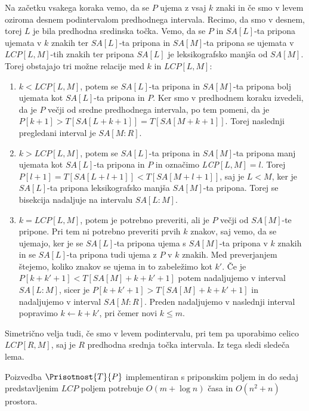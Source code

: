 Na začetku vsakega koraka vemo, da se $P$ ujema z vsaj $k$ znaki in če smo v levem oziroma desnem podintervalom predhodnega intervala. Recimo, da smo v desnem, torej $L$ je bila predhodna sredinska točka. Vemo, da se $P$ in $SA[L]$-ta pripona ujemata v $k$ znakih ter $SA[L]$-ta pripona in $SA[M]$-ta pripona se ujemata v $LCP[L,M]$-tih znakih ter pripona $SA[L]$ je leksikografsko manjša od $SA[M]$. Torej obstajajo tri možne relacije med $k$ in $LCP[L,M]$:
\begin{enumerate}
    \item $k<LCP[L,M]$, potem se $SA[L]$-ta pripona in $SA[M]$-ta pripona bolj ujemata kot $SA[L]$-ta pripona in $P$. Ker smo v predhodnem koraku izvedeli, da je $P$ večji od sredne predhodnega intervala, po tem pomeni, da je $P[k+1]>T[SA[L+k+1]]=T[SA[M+k+1]]$. Torej naslednji pregledani interval je $SA[M:R]$.
    \item $k>LCP[L,M]$, potem se $SA[L]$-ta pripona in $SA[M]$-ta pripona manj ujemata kot $SA[L]$-ta pripona in $P$ in označimo \textit{LCP}$[L,M]=l$. Torej $P[l+1]=T[SA[L+l+1]]<T[SA[M+l+1]]$, saj je $L<M$, ker je $SA[L]$-ta pripona leksikografsko manjša $SA[M]$-ta pripona. Torej se bisekcija nadaljuje na intervalu $SA[L:M]$.
    \item $k=LCP[L,M]$, potem je potrebno preveriti, ali je $P$ večji od $SA[M]$-te pripone. Pri tem ni potrebno preveriti prvih $k$ znakov, saj vemo, da se ujemajo, ker je se $SA[L]$-ta pripona ujema s $SA[M]$-ta pripona v $k$ znakih in se $SA[L]$-ta pripona tudi ujema z $P$ v $k$ znakih. Med preverjanjem štejemo, koliko znakov se ujema in to zabeležimo kot $k'$. Če je $P[k+k'+1]<T[SA[M]+k+k'+1]$ potem nadaljujemo v interval $SA[L:M]$, sicer je $P[k+k'+1]>T[SA[M]+k+k'+1]$ in nadaljujemo v interval $SA[M:R]$. Preden nadaljujemo v naslednji interval popravimo $k\leftarrow k+k'$, pri čemer novi $k\le m$.
\end{enumerate}
Simetrično velja tudi, če smo v levem podintervalu, pri tem pa uporabimo celico $LCP[R,M]$, saj je $R$ predhodna srednja točka intervala. Iz tega sledi sledeča lema.


\begin{lema}\label{lema:LCP}
    Poizvedba $\Prisotnost{T}{P}$ implementiran s priponskim poljem in do sedaj predstavljenim $LCP$ poljem potrebuje $O(m+\log{n})$ časa in $O(n^2 +n)$ prostora.
\end{lema}


